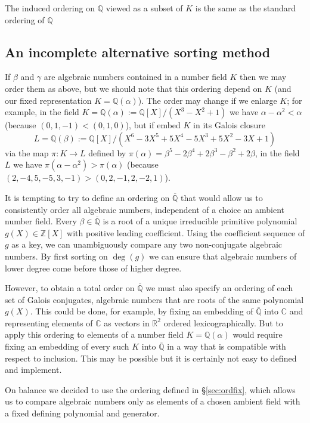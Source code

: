 \documentclass{article}
\def\Z{{\mathbb Z}}
\def\Q{{\mathbb Q}}
\def\R{{\mathbb R}}
\def\C{{\mathbb C}}
\def\Qbar{\overline{\Q}}
\begin{document}
The induced ordering on $\Q$ viewed as a subset of $K$
is the same as the standard ordering of $\Q$

\subsection{An incomplete alternative sorting method}

If $\beta$ and $\gamma$ are algebraic numbers contained in a number
field $K$ then we may order them as above, but we should note that
this ordering depend on $K$ (and our fixed representation $K=\Q(\alpha)$).
The order may change if we enlarge $K$; for example, in the field
$K=\Q(\alpha):=\Q[X]/(X^3-X^2+1)$ we have $\alpha-\alpha^2 < \alpha$
(because $(0,1,-1) < (0,1,0)$), but if
embed $K$ in its Galois closure $$L=\Q(\beta):=\Q[X]/(X^6 - 3X^5 + 5X^4 - 5X^3 + 5X^2 - 3X + 1)$$
via the map $\pi:K\to L$ defined by  $\pi(\alpha) = \beta^5 - 2\beta^4 + 2\beta^3 - \beta^2 + 2\beta$,
in the field $L$ we have $\pi(\alpha-\alpha^2) > \pi(\alpha)$
(because $(2,-4,5,-5,3,-1)>(0,2,-1,2,-2,1)$).

It is tempting to try to define an ordering on $\Qbar$ that would
allow us to consistently order all algebraic numbers, independent
of a choice an ambient number field.  Every $\beta\in\Qbar$ is a root of a
unique irreducible primitive polynomial $g(X)\in\Z[X]$  with positive
leading coefficient.  Using the coefficient sequence
of $g$ as a key, we can unambiguously  compare any two non-conjugate algebraic
numbers. By first sorting on $\deg(g)$ we can ensure that algebraic numbers of
lower degree come before those of higher degree.

However, to obtain a total order on $\Qbar$ we must also specify
an ordering of each set of Galois conjugates, algebraic numbers
that are roots of the same polynomial $g(X)$.  This could be done, for example, by fixing an
embedding of $\Qbar$ into $\C$ and representing elements of $\C$ as
vectors in $\R^2$ ordered lexicographically. But to apply this ordering to
elements of a number field $K=\Q(\alpha)$ would require fixing an
embedding of every such $K$ into $\Qbar$ in a way that is compatible
with respect to inclusion.  This may be possible but it
is certainly not easy to defined and implement.

On balance we decided to use the ordering defined in \S\ref{sec:ordfix}, which allows us to compare algebraic numbers only as elements of a chosen ambient field with a fixed defining polynomial and generator.
\end{document}
